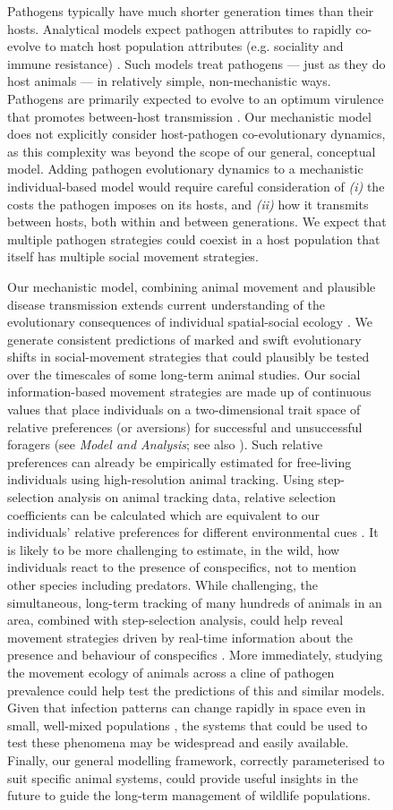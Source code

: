 \begin{figure}[!h]
Pathogens typically have much shorter generation times than their hosts.
Analytical models expect pathogen attributes to rapidly co-evolve to match host population attributes (e.g. sociality and immune resistance) \citep[][]{bonds2005,prado2009,ashby2021}.
Such models treat pathogens --- just as they do host animals --- in relatively simple, non-mechanistic ways.
Pathogens are primarily expected to evolve to an optimum virulence that promotes between-host transmission \citep{bonds2005}.
Our mechanistic model does not explicitly consider host-pathogen co-evolutionary dynamics, as this complexity was beyond the scope of our general, conceptual model.
Adding pathogen evolutionary dynamics to a mechanistic individual-based model would require careful consideration of \textit{(i)} the costs the pathogen imposes on its hosts, and \textit{(ii)} how it transmits between hosts, both within and between generations.
We expect that multiple pathogen strategies could coexist in a host population that itself has multiple social movement strategies.

Our mechanistic model, combining animal movement and plausible disease transmission extends current understanding of the evolutionary consequences of individual spatial-social ecology \citep{webber2018,albery2021}.
We generate consistent predictions of marked and swift evolutionary shifts in social-movement strategies that could plausibly be tested over the timescales of some long-term animal studies.
Our social information-based movement strategies are made up of continuous values that place individuals on a two-dimensional trait space of relative preferences (or aversions) for successful and unsuccessful foragers (see \textit{Model and Analysis}; see also \citealt{gupte2021a}).
Such relative preferences can already be empirically estimated for free-living individuals using high-resolution animal tracking.
Using step-selection analysis on animal tracking data, relative selection coefficients can be calculated which are equivalent to our individuals' relative preferences for different environmental cues \citep{avgar2016,gupte2021a}.
It is likely to be more challenging to estimate, in the wild, how individuals react to the presence of conspecifics, not to mention other species including predators.
While challenging, the simultaneous, long-term tracking of many hundreds of animals in an area, combined with step-selection analysis, could help reveal movement strategies driven by real-time information about the presence and behaviour of conspecifics \citep{nathan2022}.
More immediately, studying the movement ecology of animals across a cline of pathogen prevalence could help test the predictions of this and similar models.
Given that infection patterns can change rapidly in space even in small, well-mixed populations \citep{albery2022}, the systems that could be used to test these phenomena may be widespread and easily available.
Finally, our general modelling framework, correctly parameterised to suit specific animal systems, could provide useful insights in the future to guide the long-term management of wildlife populations.


\end{figure}
